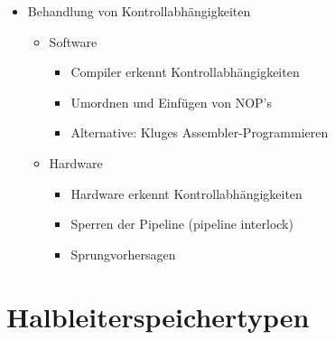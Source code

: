 \documentclass{kit}
\begin{document}
\begin{itemize}
\begin{itemize}
\begin{itemize}
\begin{itemize}
                \end{itemize}
              \item Hardware
                \begin{itemize}
                  \item Guter Aufbau der Pipeline (Art und Anordnung der Stufen, Forwarding)
                  \item Sperren der Pipeline (pipeline interlock)
                \end{itemize}
          \end{itemize}
        \item Behandlung von Kontrollabhängigkeiten
          \begin{itemize}
            \item Software
              \begin{itemize}
                \item Compiler erkennt Kontrollabhängigkeiten
                \item Umordnen und Einfügen von NOP's
                \item Alternative: Kluges Assembler-Programmieren
              \end{itemize}
            \item Hardware
              \begin{itemize}
                \item Hardware erkennt Kontrollabhängigkeiten
                \item Sperren der Pipeline (pipeline interlock)
                \item Sprungvorhersagen
              \end{itemize}
          \end{itemize}
      \end{itemize}
  \end{itemize}
\section{Halbleiterspeichertypen}
\end{document}
